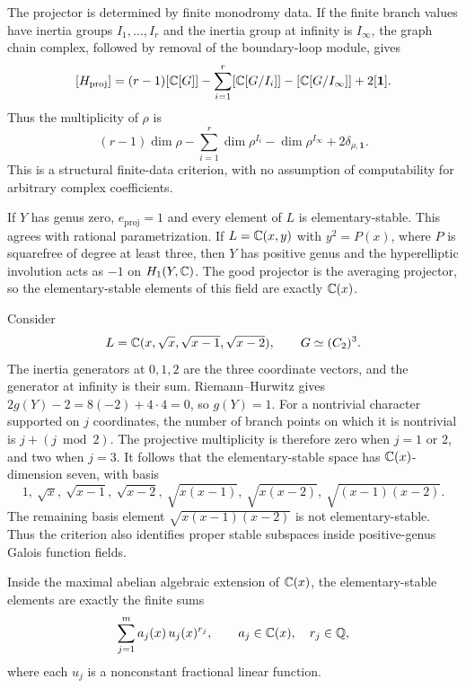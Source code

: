 The projector is determined by finite monodromy data.  If the finite
branch values have inertia groups $I_1,\ldots,I_r$ and the inertia
group at infinity is $I_\infty$, the graph chain complex, followed by
removal of the boundary-loop module, gives
\[
 [H_{\mathrm{proj}}]
  =(r-1)[\mathbb C[G]]-\sum_{i=1}^r[\mathbb C[G/I_i]]
       -[\mathbb C[G/I_\infty]]+2[\mathbf1].
\]
Thus the multiplicity of $\rho$ is
\[
 (r-1)\dim\rho-\sum_{i=1}^r\dim\rho^{I_i}
       -\dim\rho^{I_\infty}+2\delta_{\rho,\mathbf1}.
\]
This is a structural finite-data criterion, with no assumption of
computability for arbitrary complex coefficients.

\begin{example}
If $Y$ has genus zero, $e_{\mathrm{proj}}=1$ and every element of $L$
is elementary-stable.  This agrees with rational parametrization.
If $L=\mathbb C(x,y)$ with $y^2=P(x)$, where $P$ is squarefree of degree at
least three, then $Y$ has positive genus and the hyperelliptic
involution acts as $-1$ on $H_1(Y,\mathbb C)$.  The good projector is the
averaging projector, so the elementary-stable elements of this field
are exactly $\mathbb C(x)$.
\end{example}

\begin{example}
Consider
\[
 L=\mathbb C(x,\sqrt{x},\sqrt{x-1},\sqrt{x-2}),\qquad G\simeq(C_2)^3.
\]
The inertia generators at $0,1,2$ are the three coordinate vectors,
and the generator at infinity is their sum. Riemann--Hurwitz gives
$2g(Y)-2=8(-2)+4\cdot4=0$, so $g(Y)=1$.
For a nontrivial character supported on $j$ coordinates, the number
of branch points on which it is nontrivial is $j+(j\bmod2)$.
The projective multiplicity is therefore zero when $j=1$ or $2$,
and two when $j=3$. It follows that the elementary-stable space has
$\mathbb C(x)$-dimension seven, with basis
\[
 1,\ \sqrt{x},\ \sqrt{x-1},\ \sqrt{x-2},\
 \sqrt{x(x-1)},\ \sqrt{x(x-2)},\ \sqrt{(x-1)(x-2)}.
\]
The remaining basis element $\sqrt{x(x-1)(x-2)}$ is not elementary-stable.
Thus the criterion also identifies proper stable subspaces inside
positive-genus Galois function fields.
\end{example}

\begin{corollary}
\label{cor:elementary-abelian}
Inside the maximal abelian algebraic extension of $\mathbb C(x)$, the
elementary-stable elements are exactly the finite sums
\[
 \sum_{j=1}^m a_j(x)\,u_j(x)^{r_j},
 \qquad a_j\in\mathbb C(x),\quad r_j\in\mathbb Q,
\]
where each $u_j$ is a nonconstant fractional linear function.
\end{corollary}

